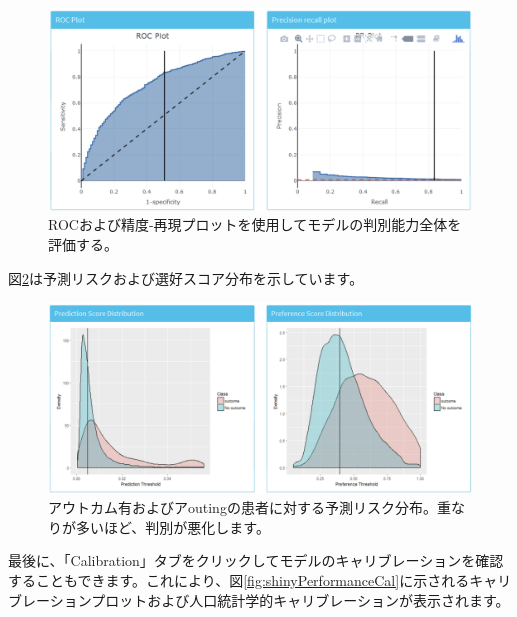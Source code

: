 \documentclass[
  11pt]{book}
\theoremstyle{definition}
\theoremstyle{definition}
\theoremstyle{definition}
\theoremstyle{definition}
\theoremstyle{remark}
\begin{document}
\begin{figure}

{\centering \includegraphics[width=1\linewidth]{images/PatientLevelPrediction/shiny/shinyPerformanceDisc} 

}

\caption{ROCおよび精度-再現プロットを使用してモデルの判別能力全体を評価する。}\label{fig:shinyPerformanceDisc}
\end{figure}

図\ref{fig:shinyPerformanceDist}は予測リスクおよび選好スコア分布を示しています。

\begin{figure}

{\centering \includegraphics[width=1\linewidth]{images/PatientLevelPrediction/shiny/shinyPerformanceDist} 

}

\caption{アウトカム有およびアoutingの患者に対する予測リスク分布。重なりが多いほど、判別が悪化します。}\label{fig:shinyPerformanceDist}
\end{figure}

最後に、「Calibration」タブをクリックしてモデルのキャリブレーションを確認することもできます。これにより、図\ref{fig:shinyPerformanceCal}に示されるキャリブレーションプロットおよび人口統計学的キャリブレーションが表示されます。
\end{document}
